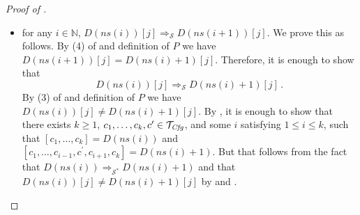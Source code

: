 \begin{proof}[Proof of ]
\begin{itemize}
\begin{itemize}
        and transitivity of equality;
        \item for any $i \in \mathbb{N}$, $D(\mathit{ns}(i))[j] \Rightarrow_{\mathcal{S}} D(\mathit{ns}(i+1))[j]$.
        We prove this as follows. By
        (4) of  and definition of $P$ we have
        $D(\mathit{ns}(i+1))[j] = D(\mathit{ns}(i)+1)[j]$.
        Therefore, it is enough to show that
        \begin{equation*}
            D(\mathit{ns}(i))[j] \Rightarrow_{\mathcal{S}} D(\mathit{ns}(i)+1)[j] \, .
        \end{equation*}
        By (3) of  and definition of $P$ we have
        $D(\mathit{ns}(i))[j] \not = D(\mathit{ns}(i)+1)[j]$.
        By , it is enough to show that there exists $k \geq 1$,
        $c_1,\ldots,c_k,c^\prime \in \mathcal{T}_{\mathit{Cfg}}$, and some $i$ satisfying $1 \leq i \leq k$,
        such that
        $[c_1,\ldots,c_k] = D(\mathit{ns}(i))$
        and
        $[c_1,\ldots,c_{i-1},c^\prime,c_{i+1},c_k] = D(\mathit{ns}(i) + 1)$.
        But that follows from the fact that $D(\mathit{ns}(i)) \Rightarrow_{\mathcal{S}^*} D(\mathit{ns}(i) + 1)$
        and that $D(\mathit{ns}(i))[j] \not = D(\mathit{ns}(i)+1)[j]$
        by  and .
    \end{itemize}
\end{itemize}
\end{proof}


